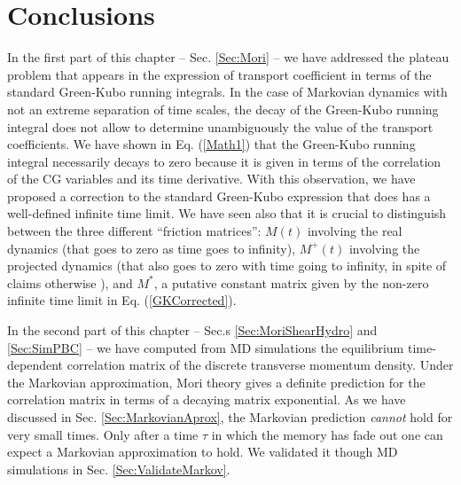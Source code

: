\documentclass[a4paper,openright,12pt]{book}
\begin{document}
\section{Conclusions}
\label{Sec:ConclusionsChapPBC}
In the first part of this chapter -- Sec. \ref{Sec:Mori} -- we have addressed  the plateau problem that  appears in
the  expression of  transport  coefficient in  terms  of the  standard
Green-Kubo running integrals.  In the  case of Markovian dynamics with
not an extreme separation of time  scales, the decay of the Green-Kubo
running integral does  not allow to determine  unambiguously the value
of the  transport coefficients.  We  have shown in  Eq.  (\ref{Math1})
that  the  Green-Kubo  running  integral necessarily  decays  to  zero
because it  is given in terms  of the correlation of  the CG variables
and its  time derivative.  With  this observation, we have  proposed a
correction  to  the  standard  Green-Kubo  expression  that  does  has  a
well-defined infinite time limit. We have seen also that it is crucial
to  distinguish between  the  three  different ``friction  matrices'':
$M(t)$ involving the real dynamics (that  goes to zero as time goes to
infinity), $M^+(t)$  involving the projected dynamics  (that also goes
to zero  with time  going to  infinity, in  spite of  claims otherwise
\cite{Kubo1991,Espanol1993}),  and $M^*$,  a putative  constant
matrix   given    by   the    non-zero   infinite   time    limit   in
Eq. (\ref{GKCorrected}).


In the second part of this chapter -- Sec.s \ref{Sec:MoriShearHydro} and \ref{Sec:SimPBC} --  we  have computed from  MD simulations  the equilibrium
time-dependent correlation matrix of  the discrete transverse momentum
density.   Under  the Markovian  approximation,  Mori  theory gives  a
definite prediction for the correlation  matrix in terms of a decaying
matrix exponential.   As we  have discussed in Sec. \ref{Sec:MarkovianAprox}, the  Markovian prediction
\textit{cannot}  hold for  very small  times. Only after a time $\tau$ in which the memory
has fade out one can expect a Markovian approximation to hold. We validated it though MD simulations in Sec. \ref{Sec:ValidateMarkov}.
\end{document}
